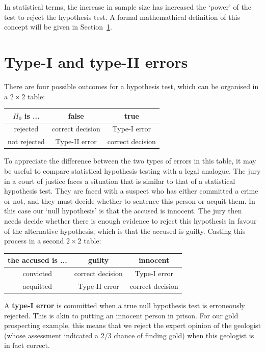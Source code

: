 In statistical terms, the increase in sample size has increased the
`power' of the test to reject the hypothesis test. A formal
mathemathical definition of this concept will be given in
Section~\ref{sec:typeI&II}.

\section{Type-I and type-II errors}
\label{sec:typeI&II}

There are four possible outcomes for a hypothesis test, which can be
organised in a ${2}\times{2}$ table:

\begin{center}
\begin{tabular}{c|cc}
  $H_0$ is ... & false & true \\ \hline
  rejected & correct decision & Type-I error \\
  not rejected & Type-II error & correct decision
\end{tabular}
\end{center}

To appreciate the difference between the two types of errors in this
table, it may be useful to compare statistical hypothesis testing with
a legal analogue. The jury in a court of justice faces a situation
that is similar to that of a statistical hypothesis test. They are
faced with a suspect who has either committed a crime or not, and they
must decide whether to sentence this person or acquit them.  In this
case our `null hypothesis' is that the accused is innocent.  The jury
then needs decide whether there is enough evidence to reject this
hypothesis in favour of the alternative hypothesis, which is that the
accused is guilty. Casting this process in a second ${2}\times{2}$
table:

\begin{center}
\begin{tabular}{c|cc}
  the accused is ... & guilty & innocent \\ \hline
  convicted & correct decision & Type-I error \\
  acquitted & Type-II error & correct decision
\end{tabular}
\end{center}

A \textbf{type-I error} is committed when a true null hypothesis test
is erroneously rejected. This is akin to putting an innocent person in
prison. For our gold prospecting example, this means that we reject
the expert opinion of the geologist (whose assessment indicated a 2/3
chance of finding gold) when this geologist is in fact
correct.\medskip

